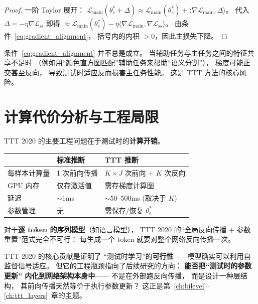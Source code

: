 \begin{proof}
一阶 Taylor 展开：
$\mathcal{L}_\text{main}(\theta_e^* + \Delta)
\approx \mathcal{L}_\text{main}(\theta_e^*)
+ \langle \nabla \mathcal{L}_\text{main}, \Delta \rangle$。
代入 $\Delta = -\eta \nabla \mathcal{L}_\text{ss}$
即得 $\approx \mathcal{L}_\text{main}(\theta_e^*)
- \eta \langle \nabla \mathcal{L}_\text{main},
\nabla \mathcal{L}_\text{ss} \rangle$。
由条件~\eqref{eq:gradient_alignment}，
括号内的内积 $> 0$，因此主损失下降。
\end{proof}

\begin{remark}
条件~\eqref{eq:gradient_alignment} 并不总是成立。
当辅助任务与主任务之间的特征共享不足时
（例如用``颜色直方图匹配''辅助任务来帮助``语义分割''），
梯度可能正交甚至反向，
导致测试时适应反而损害主任务性能。
这是 TTT 方法的核心风险。
\end{remark}

\section{计算代价分析与工程局限}
\label{sec:ttt_limits}

TTT 2020 的主要工程问题在于测试时的\textbf{计算开销}。

\begin{center}
\begin{tabular}{p{3.5cm} p{4.5cm} p{4.5cm}}
\toprule
& \textbf{标准推断} & \textbf{TTT 推断} \\
\midrule
每样本计算量 & 1 次前向传播 & $K \times J$ 次前向 + $K$ 次反向 \\
GPU 内存 & 仅存激活值 & 需存梯度计算图 \\
延迟 & $\sim$1ms & $\sim$50--500ms (取决于 $K$) \\
参数管理 & 无 & 需保存/恢复 $\theta_e^*$ \\
\bottomrule
\end{tabular}
\end{center}

对于\textbf{逐 token 的序列模型}（如语言模型），
TTT 2020 的``全局反向传播 + 参数重置''范式完全不可行：
每生成一个 token 就要对整个网络反向传播一次。

\begin{insight}[title=从外部微调到架构内化]
TTT 2020 的核心贡献是证明了
``测试时学习''的\textbf{可行性}——模型确实可以利用自监督信号适应。
但它的工程瓶颈指向了后续研究的方向：
\textbf{能否把``测试时的参数更新''
内化到网络架构本身中}——
不是在外部跑反向传播，
而是设计一种层结构，
其前向传播天然等价于执行参数更新？
这正是第~\ref{ch:bilevel}--\ref{ch:ttt_layers}~章的主题。
\end{insight}

